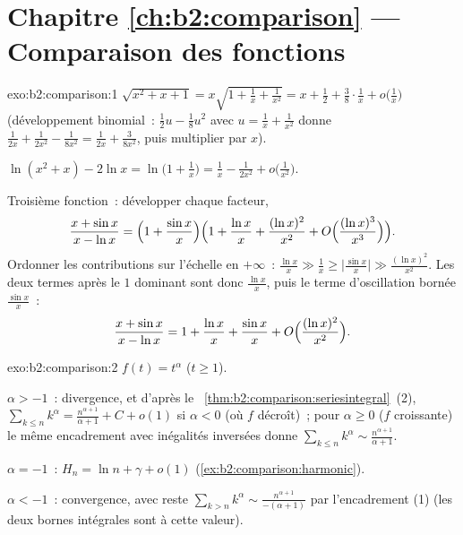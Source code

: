 \section*{Chapitre \ref{ch:b2:comparison} --- Comparaison des fonctions}

\begin{solution}{exo:b2:comparison:1}
$\sqrt{x^2 + x + 1} = x\sqrt{1 + \tfrac1x + \tfrac{1}{x^2}} = x +
\frac12 + \frac38\cdot\frac1x + o\bigl(\frac1x\bigr)$ (développement
binomial~: $\frac12 u - \frac18 u^2$ avec $u = \frac1x +
\frac{1}{x^2}$ donne $\frac{1}{2x} + \frac{1}{2x^2} -
\frac{1}{8x^2} = \frac{1}{2x} + \frac{3}{8x^2}$, puis multiplier par
$x$).

$\ln(x^2 + x) - 2\ln x = \ln\bigl(1 + \tfrac1x\bigr) = \frac1x -
\frac{1}{2x^2} + o\bigl(\frac{1}{x^2}\bigr)$.

Troisième fonction~: développer chaque facteur,
\[
\frac{x + \sin x}{x - \ln x}
= \Bigl(1 + \frac{\sin x}{x}\Bigr)
\Bigl(1 + \frac{\ln x}{x} + \frac{(\ln x)^2}{x^2} +
O\Bigl(\frac{(\ln x)^3}{x^3}\Bigr)\Bigr).
\]
Ordonner les contributions sur l'échelle en $+\infty$~: $\frac{\ln x}{x}
\gg \frac{1}{x} \geq \bigl|\frac{\sin x}{x}\bigr| \gg \frac{(\ln
x)^2}{x^2}$. Les deux termes après le $1$ dominant sont donc
$\frac{\ln x}{x}$, puis le terme d'oscillation bornée $\frac{\sin
x}{x}$~:
\[
\frac{x + \sin x}{x - \ln x}
= 1 + \frac{\ln x}{x} + \frac{\sin x}{x}
+ O\Bigl(\frac{(\ln x)^2}{x^2}\Bigr).
\]
\end{solution}

\begin{solution}{exo:b2:comparison:2}
$f(t) = t^\alpha$ ($t \geq 1$).

$\alpha > -1$~: divergence, et d'après le~%
\cref{thm:b2:comparison:seriesintegral}~(2), $\sum_{k\leq n}
k^\alpha = \frac{n^{\alpha+1}}{\alpha+1} + C + o(1)$ si $\alpha <
0$ (où $f$ décroît)~; pour $\alpha \geq 0$ ($f$ croissante) le
même encadrement avec inégalités inversées donne $\sum_{k \leq n}
k^\alpha \sim \frac{n^{\alpha + 1}}{\alpha + 1}$.

$\alpha = -1$~: $H_n = \ln n + \gamma + o(1)$
(\cref{ex:b2:comparison:harmonic}).

$\alpha < -1$~: convergence, avec reste $\sum_{k > n} k^\alpha
\sim \frac{n^{\alpha+1}}{-(\alpha+1)}$ par l'encadrement (1) (les deux
bornes intégrales sont  à cette valeur).
\end{solution}

